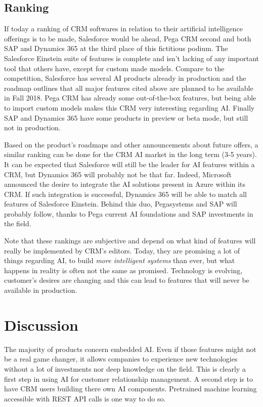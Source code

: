 \subsection{Ranking}
If today a ranking of CRM softwares in relation to their artificial intelligence offerings is to be made, Salesforce would be ahead, Pega CRM second and both SAP and Dynamics 365 at the third place of this fictitious podium. The Salesforce Einstein suite of features is complete and isn't lacking of any important tool that others have, except for custom made models. Compare to the competition, Salesforce has several AI products already in production and the roadmap outlines that all major features cited above are planned to be available in Fall 2018. Pega CRM has already some out-of-the-box features, but being able to import custom models makes this CRM very interesting regarding AI. Finally SAP and Dynamics 365 have some products in preview or beta mode, but still not in production. 

Based on the product's roadmaps and other announcements about future offers, a similar ranking can be done for the CRM AI market in the long term (3-5 years). It can be expected that Salesforce will still be the leader for AI features within a CRM, but Dynamics 365 will probably not be that far. Indeed, Microsoft announced the desire to integrate the AI solutions present in Azure within its CRM. If such integration is successful, Dynamics 365 will be able to match all features of Salesforce Einstein. Behind this duo, Pegasystems and SAP will probably follow, thanks to Pega current AI foundations and SAP investments in the field. 

Note that these rankings are subjective and depend on what kind of features will really be implemented by CRM's editors. Today, they are promising a lot of things regarding AI, to build \textit{more intelligent systems} than ever, but what happens in reality is often not the same as promised. Technology is evolving, customer's desires are changing and this can lead to features that will never be available in production.

\section{Discussion}
The majority of products concern embedded AI. Even if those features might not be a real game changer, it allows companies to experience new technologies without a lot of investments nor deep knowledge on the field. This is clearly a first step in using AI for customer relationship management. A second step is to have CRM users building there own AI components. Pretrained machine learning accessible with REST API calls is one way to do so.

